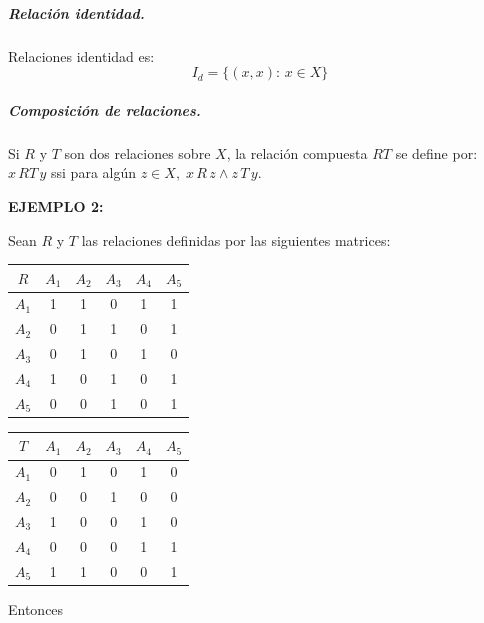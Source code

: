 \documentclass[a5paper,doc,10pt,noapacite]{apa6}
\begin{document}
{{\subparagraph{Relación identidad.}

Relaciones identidad es:
\[
	I_d = \big\{ (x,x) : \, x \in X \big\}
\]


\subparagraph{Composición de relaciones.}

Si \(R\) y \(T\) son dos relaciones sobre \(X\), la relación compuesta \(RT\) se define por: \(x \, RT \, y\) ssi para algún \(z \in X, \; x \, R\, z \wedge z \, T\, y\).

%
\vspace{1\baselineskip}
\textbf{EJEMPLO 2:}

Sean \(R\) y \(T\) las relaciones definidas por las siguientes matrices:

%
\begin{table}[H]
	\fontsize{7}{11}\selectfont
    \begin{minipage}{.5\linewidth}
      \centering
	\begin{tabular}{c|ccccc} \thickline
	\(R\) & \(A_1\) & \(A_2\) & \(A_3\) & \(A_4\) & \(A_5\)  \\	\hline
    \(A_1\) & 1 & 1 & 0 & 1 & 1  \\
    \(A_2\) & 0 & 1 & 1 & 0 & 1  \\
	\(A_3\) & 0 & 1 & 0 & 1 & 0   \\
	\(A_4\) & 1 & 0 & 1 & 0 & 1   \\
	\(A_5\) & 0 & 0 & 1 & 0 & 1   \\
\end{tabular}
\label{tab:B2} 
    \end{minipage}%
    \begin{minipage}{.5\linewidth}
      \centering
	\begin{tabular}{c|ccccc} \thickline
	\(T\) & \(A_1\) & \(A_2\) & \(A_3\) & \(A_4\) & \(A_5\)  \\	\hline
    \(A_1\) & 0 & 1 & 0 & 1 & 0  \\
    \(A_2\) & 0 & 0 & 1 & 0 & 0  \\
	\(A_3\) & 1 & 0 & 0 & 1 & 0   \\
	\(A_4\) & 0 & 0 & 0 & 1 & 1   \\
	\(A_5\) & 1 & 1 & 0 & 0 & 1   \\
\end{tabular}
\label{tab:B3}
    \end{minipage} 
\end{table}
%

\vfill
\newpage

Entonces

}}
\end{document}
